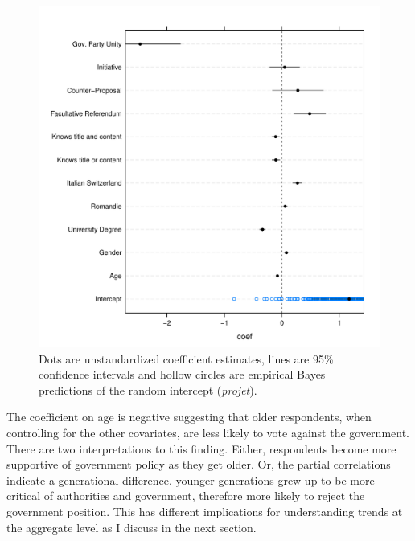 \documentclass[11pt,a4paper]{article}\usepackage[]{graphicx}\usepackage[]{color}
\makeatletter
\def\maxwidth{ %
  \ifdim\Gin@nat@width>\linewidth
    \linewidth
  \else
    \Gin@nat@width
  \fi
}
\newenvironment{knitrout}{}{} %
\makeatother
\begin{document}
    \begin{figure}[htb]
\begin{knitrout}
\color{fgcolor}
\includegraphics[width=\maxwidth]{figure/fig3-1} 

\end{knitrout}
        \caption{Dots are unstandardized coefficient estimates, lines are 95\% confidence intervals and hollow circles are empirical Bayes predictions of the random intercept (\textit{projet}).}\label{fig:coef}
    \end{figure}
    
    The coefficient on age is negative suggesting that older respondents, when controlling for the other covariates, are less likely to vote against the government. There are two interpretations to this finding. Either, respondents become more supportive of government policy as they get older. Or, the partial correlations indicate a generational difference. younger generations grew up to be more critical of authorities and government, therefore more likely to reject the government position. %
    This has different implications for understanding trends at the aggregate level as I discuss in the next section.
    
\end{document}
